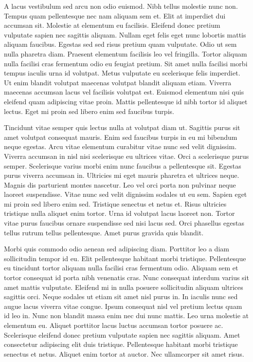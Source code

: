 \documentclass[11pt,a4paper]{article}
\begin{document}
A lacus vestibulum sed arcu non odio euismod. Nibh tellus molestie nunc non. Tempus quam pellentesque nec nam aliquam sem et. Elit at imperdiet dui accumsan sit. Molestie at elementum eu facilisis. Eleifend donec pretium vulputate sapien nec sagittis aliquam. Nullam eget felis eget nunc lobortis mattis aliquam faucibus. Egestas sed sed risus pretium quam vulputate. Odio ut sem nulla pharetra diam. Praesent elementum facilisis leo vel fringilla. Tortor aliquam nulla facilisi cras fermentum odio eu feugiat pretium. Sit amet nulla facilisi morbi tempus iaculis urna id volutpat. Metus vulputate eu scelerisque felis imperdiet. Ut enim blandit volutpat maecenas volutpat blandit aliquam etiam. Viverra maecenas accumsan lacus vel facilisis volutpat est. Euismod elementum nisi quis eleifend quam adipiscing vitae proin. Mattis pellentesque id nibh tortor id aliquet lectus. Eget mi proin sed libero enim sed faucibus turpis.

Tincidunt vitae semper quis lectus nulla at volutpat diam ut. Sagittis purus sit amet volutpat consequat mauris. Enim sed faucibus turpis in eu mi bibendum neque egestas. Arcu vitae elementum curabitur vitae nunc sed velit dignissim. Viverra accumsan in nisl nisi scelerisque eu ultrices vitae. Orci a scelerisque purus semper. Scelerisque varius morbi enim nunc faucibus a pellentesque sit. Egestas purus viverra accumsan in. Ultricies mi eget mauris pharetra et ultrices neque. Magnis dis parturient montes nascetur. Leo vel orci porta non pulvinar neque laoreet suspendisse. Vitae nunc sed velit dignissim sodales ut eu sem. Sapien eget mi proin sed libero enim sed. Tristique senectus et netus et. Risus ultricies tristique nulla aliquet enim tortor. Urna id volutpat lacus laoreet non. Tortor vitae purus faucibus ornare suspendisse sed nisi lacus sed. Orci phasellus egestas tellus rutrum tellus pellentesque. Amet purus gravida quis blandit.

Morbi quis commodo odio aenean sed adipiscing diam. Porttitor leo a diam sollicitudin tempor id eu. Elit pellentesque habitant morbi tristique. Pellentesque eu tincidunt tortor aliquam nulla facilisi cras fermentum odio. Aliquam sem et tortor consequat id porta nibh venenatis cras. Nunc consequat interdum varius sit amet mattis vulputate. Eleifend mi in nulla posuere sollicitudin aliquam ultrices sagittis orci. Neque sodales ut etiam sit amet nisl purus in. In iaculis nunc sed augue lacus viverra vitae congue. Ipsum consequat nisl vel pretium lectus quam id leo in. Nunc non blandit massa enim nec dui nunc mattis. Leo urna molestie at elementum eu. Aliquet porttitor lacus luctus accumsan tortor posuere ac. Scelerisque eleifend donec pretium vulputate sapien nec sagittis aliquam. Amet consectetur adipiscing elit duis tristique. Pellentesque habitant morbi tristique senectus et netus. Aliquet enim tortor at auctor. Nec ullamcorper sit amet risus.
\end{document}
